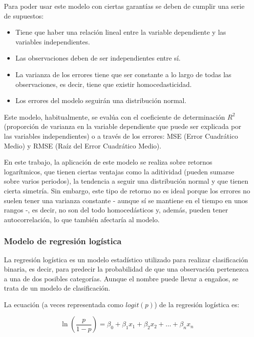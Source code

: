 Para poder usar este modelo con ciertas garantías se deben de cumplir una serie de supuestos:

\begin{itemize}
\tightlist
\item  
Tiene que haber una relación lineal entre la variable dependiente y las variables independientes. 
\item
Las observaciones deben de ser independientes entre sí. 
\item
La varianza de los errores tiene que ser constante a lo largo de todas las observaciones, es decir, tiene que existir homocedasticidad\citep{wiki:homocedasticidad}.
\item
Los errores del modelo seguirán una distribución normal. 
\end{itemize}

Este modelo, habitualmente, se evalúa con el coeficiente de determinación $R^{2}$ (proporción de varianza en la variable dependiente que puede ser explicada por las variables independientes) o a través de los errores: MSE (Error Cuadrático Medio) y RMSE (Raíz del Error Cuadrático Medio). 

En este trabajo, la aplicación de este modelo se realiza sobre retornos logarítmicos, que tienen ciertas ventajas como la aditividad (pueden sumarse sobre varios periodos), la tendencia a seguir una distribución normal y que tienen cierta simetría. Sin embargo, este tipo de retorno no es ideal porque los errores no suelen tener una varianza constante - aunque sí se mantiene en el tiempo en unos rangos -, es decir, no son del todo homocedásticos y, además, pueden tener autocorrelación, lo que también afectaría al modelo. 

\subsubsection{Modelo de regresión logística}

La regresión logística es un modelo estadístico utilizado para realizar clasificación binaria, es decir, para predecir la probabilidad de que una observación pertenezca a una de dos posibles categorías. Aunque el nombre puede llevar a engaños, se trata de un modelo de clasificación.

La ecuación (a veces representada como $logit(p)$) de la regresión logística es: 

\begin{equation}
	\ln (\frac{p}{1-p}) = \beta_{0} + \beta_{1}x_{1} + \beta_{2}x_{2} + \ldots + \beta_{n}x_{n}
\end{equation}

